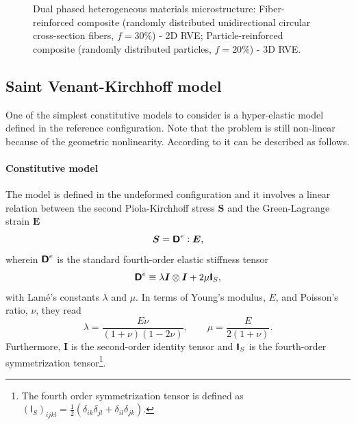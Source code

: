\begin{figure}[hbt]
\begin{subfigure}[b]{0.45\textwidth}
    \caption{}
    \label{subfig:3d_microstructure}
  \end{subfigure}
\caption{Dual phased heterogeneous materials microstructure:  Fiber-reinforced composite (randomly distributed unidirectional circular cross-section fibers, \(f=30\%\)) - 2D RVE;  Particle-reinforced composite (randomly distributed particles, \(f=20\%\)) - 3D RVE.}
\label{fig:microstructure}
\end{figure}



\subsection{Saint Venant-Kirchhoff model}

One of the simplest constitutive models to consider is a hyper-elastic model defined in the reference configuration.
Note that the problem is still non-linear because of the geometric nonlinearity.
According to \cite{de_geus_finite_2017} it can be described as follows.

\paragraph{Constitutive model}
The model is defined in the undeformed configuration and it involves a linear relation between the second Piola-Kirchhoff stress \(\boldsymbol{S}\) and the Green-Lagrange strain \(\boldsymbol{E}\)
\begin{equation} \label{eq:saint_venant_constitutive_equation}
\boldsymbol{S}=\boldsymbol{\mathsf{D}}^e: \boldsymbol{E},
\end{equation}
wherein \(\boldsymbol{\mathsf{D}}^e\) is the standard fourth-order elastic stiffness tensor
\begin{equation}
\boldsymbol{\mathsf{D}}^e\equiv\lambda \boldsymbol{I} \otimes \boldsymbol{I}+2 \mu \boldsymbol{\mathsf{I}}_{S},
\end{equation}
with Lamé's constants \(\lambda\) and \(\mu\). In terms of Young's modulus, \(E\), and Poisson's ratio, \(\nu\), they read
\begin{equation}
\lambda=\frac{E \nu}{(1+\nu)(1-2 \nu)}, \qquad \mu=\frac{E}{2(1+\nu)}.
\end{equation}
Furthermore, \(\boldsymbol{I}\) is the second-order identity tensor and \(\boldsymbol{\mathsf{I}}_{S}\) is the fourth-order symmetrization tensor\footnote{The fourth order symmetrization tensor is defined as \({(\mathsf I_S)}_{ijkl} = \frac{1}{2}(\delta_{ik}\delta_{jl} + \delta_{il}\delta_{jk})\).}.

